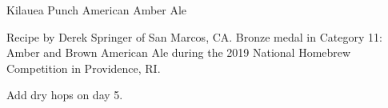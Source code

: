 \begin{recipe}{Kilauea Punch American Amber Ale}

\begin{aboutblock}
Recipe by Derek Springer of San Marcos, CA. Bronze medal in Category 11:
Amber and Brown American Ale during the 2019 National Homebrew Competition
in Providence, RI. \sourceaha
\end{aboutblock}


\begin{methodandtiming}
 
\begin{mashsteps}
\end{mashsteps}

\begin{fermentationsteps}
\end{fermentationsteps}

\begin{directions}
Add dry hops on day 5.
\end{directions}

\end{methodandtiming}

\recipebreak

\begin{ingredientsblock}

\begin{malts}
\end{malts}

\begin{hops}
\end{hops}


\end{ingredientsblock}

\end{recipe}

